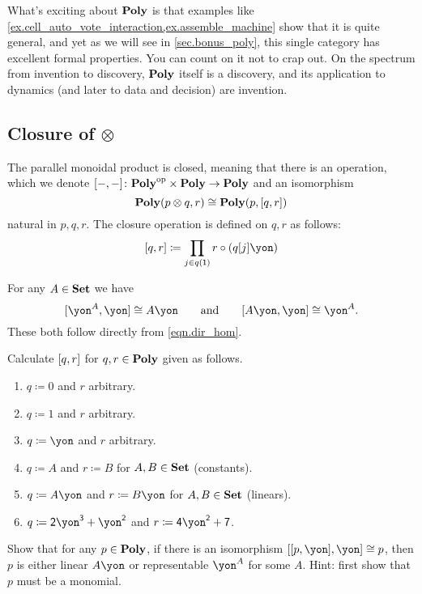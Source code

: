 \documentclass[DynamicalBook]{subfiles}
\begin{document}
What's exciting about $\textbf{Poly}$ is that examples like \cref{ex.cell_auto_vote_interaction,ex.assemble_machine} show that it is quite general, and yet as we will see in \cref{sec.bonus_poly}, this single category has excellent formal properties. You can count on it not to crap out. On the spectrum from invention to discovery, $\textbf{Poly}$ itself is a discovery, and its application to dynamics (and later to data and decision) are invention.

\subsection{Closure of $\otimes$}

The parallel monoidal product is closed, meaning that there is an operation, which we denote $[-,-]\colon\textbf{Poly}^{\textnormal{op}}\times\textbf{Poly}\to\textbf{Poly}$ and an isomorphism
\[
  \textbf{Poly}(p\otimes q,r)\cong\textbf{Poly}(p,[q,r])
\]
natural in $p,q,r$. The closure operation is defined on $q,r$ as follows:
\begin{equation}\label{eqn.dir_hom}
	\ihom{q,r}\coloneqq\prod_{j\in q(\1)}r\circ(q[j]\yon)
\end{equation}

\begin{example}\label{ex.double_dual}
For any $A\in\textbf{Set}$ we have
\[
  \ihom{\yon^A,\yon}\cong A\yon
  \qqand
  \ihom{A\yon,\yon}\cong\yon^A.
\]
These both follow directly from \eqref{eqn.dir_hom}.
\end{example}

\begin{exercise}
Calculate $[q,r]$ for $q,r\in\textbf{Poly}$ given as follows.
\begin{enumerate}
	\item $q\coloneqq 0$ and $r$ arbitrary.
	\item $q\coloneqq 1$ and $r$ arbitrary.
	\item $q\coloneqq\yon$ and $r$ arbitrary.
	\item $q\coloneqq A$ and $r\coloneqq B$ for $A,B\in\textbf{Set}$ (constants).
	\item $q\coloneqq A\yon$ and $r\coloneqq B\yon$ for $A,B\in\textbf{Set}$ (linears).
	\item $q\coloneqq\2\yon^\3+\yon^\2$ and $r\coloneqq\4\yon^\2+\7$.
\qedhere
\end{enumerate}
\end{exercise}

\begin{exercise}
Show that for any $p\in\textbf{Poly}$, if there is an isomorphism $\ihom{\ihom{p,\yon},\yon}\cong p$, then $p$ is either linear $A\yon$ or representable $\yon^A$ for some $A$. Hint: first show that $p$ must be a monomial.
\end{exercise}
\end{document}
